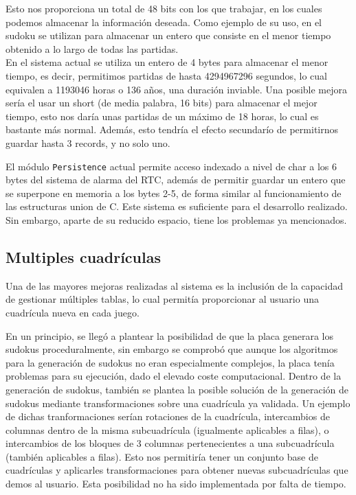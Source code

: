 \documentclass[12pt,letterpaper]{article}
\begin{document}

Esto nos proporciona un total de 48 bits con los que trabajar, en los
cuales podemos almacenar la información deseada. Como ejemplo de su
uso, en el sudoku se utilizan para almacenar un entero que consiste en
el menor tiempo obtenido a lo largo de todas las partidas.\\

En el sistema actual se utiliza un entero de 4 bytes para almacenar el
menor tiempo, es decir, permitimos partidas de hasta 4294967296
segundos, lo cual equivalen a 1193046 horas o 136 años, una duración
inviable. Una posible mejora sería el usar un short (de media palabra,
16 bits) para almacenar el mejor tiempo, esto nos daría unas partidas
de un máximo de 18 horas, lo cual es bastante más normal. Además, esto
tendría el efecto secundarío de permitirnos guardar hasta 3 records, y
no solo uno.

El módulo \texttt{Persistence} actual permite acceso indexado a nivel
de char a los 6 bytes del sistema de alarma del RTC, además de
permitir guardar un entero que se superpone en memoria a los bytes
2-5, de forma similar al funcionamiento de las estructuras union de
C. Este sistema es suficiente para el desarrollo realizado. Sin
embargo, aparte de su reducido espacio, tiene los problemas ya
mencionados.

\subsection{Multiples cuadrículas}
\label{subsec:multiples-cuadriculas}
Una de las mayores mejoras realizadas al sistema es la inclusión de la
capacidad de gestionar múltiples tablas, lo cual permitía proporcionar
al usuario una cuadrícula nueva en cada juego.

En un principio, se llegó a plantear la posibilidad de que la placa
generara los sudokus proceduralmente, sin embargo se comprobó que
aunque los algoritmos para la generación de sudokus no eran
especialmente complejos, la placa tenía problemas para su ejecución,
dado el elevado coste computacional. Dentro de la generación de
sudokus, también se plantea la posible solución de la generación de
sudokus mediante transformaciones sobre una cuadrícula ya validada. Un
ejemplo de dichas tranformaciones serían rotaciones de la cuadrícula,
intercambios de columnas dentro de la misma subcuadrícula (igualmente
aplicables a filas), o intercambios de los bloques de 3 columnas
pertenecientes a una subcuadrícula (también aplicables a filas). Esto
nos permitiría tener un conjunto base de cuadrículas y aplicarles
transformaciones para obtener nuevas subcuadrículas que demos al
usuario. Esta posibilidad no ha sido implementada por falta de tiempo.
\end{document}
